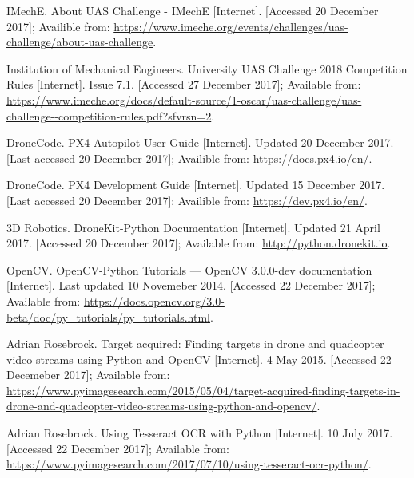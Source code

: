 \documentclass[11pt]{article}
\begin{document}
\newpage
\begin{thebibliography}{11}

    IMechE. About UAS Challenge - IMechE [Internet]. [Accessed 20 December 2017]; Availible from: \url{https://www.imeche.org/events/challenges/uas-challenge/about-uas-challenge}.

    Institution of Mechanical Engineers. University UAS Challenge 2018 Competition Rules [Internet]. Issue 7.1. [Accessed 27 December 2017]; Available from: \url{https://www.imeche.org/docs/default-source/1-oscar/uas-challenge/uas-challenge--competition-rules.pdf?sfvrsn=2}.

    DroneCode. PX4 Autopilot User Guide [Internet]. Updated 20 December 2017. [Last accessed 20 December 2017]; Availible from: \url{https://docs.px4.io/en/}.

    DroneCode. PX4 Development Guide [Internet]. Updated 15 December 2017. [Last accessed 20 December 2017]; Availible from: \url{https://dev.px4.io/en/}.

    3D Robotics. DroneKit-Python Documentation [Internet]. Updated 21 April 2017. [Accessed 20 December 2017]; Available from: \url{http://python.dronekit.io}.

    OpenCV. OpenCV-Python Tutorials — OpenCV 3.0.0-dev documentation [Internet]. Last updated 10 Novemeber 2014. [Accessed 22 December 2017]; Available from: \url{https://docs.opencv.org/3.0-beta/doc/py_tutorials/py_tutorials.html}.

    Adrian Rosebrock. Target acquired: Finding targets in drone and quadcopter video streams using Python and OpenCV [Internet]. 4 May 2015. [Accessed 22 Decemeber 2017]; Available from: \url{https://www.pyimagesearch.com/2015/05/04/target-acquired-finding-targets-in-drone-and-quadcopter-video-streams-using-python-and-opencv/}.

    Adrian Rosebrock. Using Tesseract OCR with Python [Internet]. 10 July 2017. [Accessed 22 December 2017]; Available from: \url{https://www.pyimagesearch.com/2017/07/10/using-tesseract-ocr-python/}.


\end{thebibliography}
\end{document}
